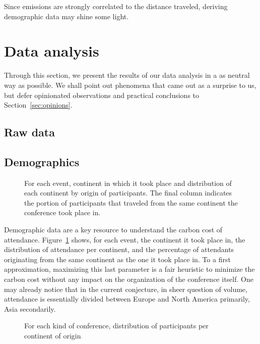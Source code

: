 \documentclass[manuscript, review, screen]{acmart}
\newcommand{\event}{event} %
\begin{document}
Since emissions are strongly correlated to the distance traveled, deriving
demographic data may shine some light.

\section{Data analysis}
\label{sec:data}

Through this section, we present the results of our data analysis in a as
neutral way as possible. We shall point out phenomena that came out as a
surprise to us, but defer opinionated observations and practical conclusions to
Section~\ref{sec:opinions}.

\subsection{Raw data}

\subsection{Demographics}
\label{subsec:demo}

\begin{figure}
  \caption{For each \event, continent in which it took place and distribution of
    each continent by origin of participants. The final column indicates the
    portion of participants that traveled from the same continent the
    conference took place in.}
  \label{fig:demo-raw}
\end{figure}

Demographic data are a key resource to understand the carbon cost of attendance.
Figure~\ref{fig:demo-raw} shows, for each \event, the
continent it took place in, the distribution of attendance per continent, and
the percentage of attendants originating from the same continent as the one it
took place in. To a first approximation, maximizing this last parameter is a fair
heuristic to minimize the carbon cost without any impact on the organization of
the conference itself. One may already notice that in the current conjecture, in
sheer question of volume, attendance is essentially divided between Europe and
North America primarily, Asia secondarily.

\begin{figure}
\caption{For each kind of conference, distribution of participants per continent of origin}
\label{fig:demo-conf}
\end{figure}
\end{document}
